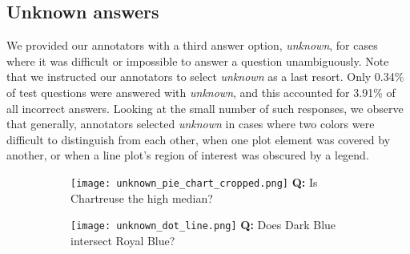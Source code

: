 \documentclass{article} \usepackage{iclr2018_workshop,times}
\begin{document}
\FloatBarrier

\subsection{Unknown answers}
We provided our annotators with a third answer option, \emph{unknown}, for cases where it was difficult or impossible to answer a question unambiguously. Note that we instructed our annotators to select \emph{unknown} as a last resort. Only 0.34\% of test questions were answered with \emph{unknown}, and this accounted for 3.91\% of all incorrect answers. Looking at the small number of such responses, we observe that generally, annotators selected \emph{unknown} in cases where two colors were difficult to distinguish from each other, when one plot element was covered by another, or when a line plot's region of interest was obscured by a legend.

\begin{figure}[h]
    \centering
    \caption{Sample figures with unknown answers provided by human annotators.}
    \label{fig:unknown_answers}
    \begin{subfigure}[]{0.5\textwidth}
        \texttt{[image: unknown\_pie\_chart\_cropped.png]}
        \textbf{Q:} Is Chartreuse the high median?\newline
    \end{subfigure}
    \begin{subfigure}[]{0.49\textwidth}
        \texttt{[image: unknown\_dot\_line.png]}
        \textbf{Q:} Does Dark Blue intersect Royal Blue?\newline
    \end{subfigure}
\end{figure}

\newpage
\end{document}
